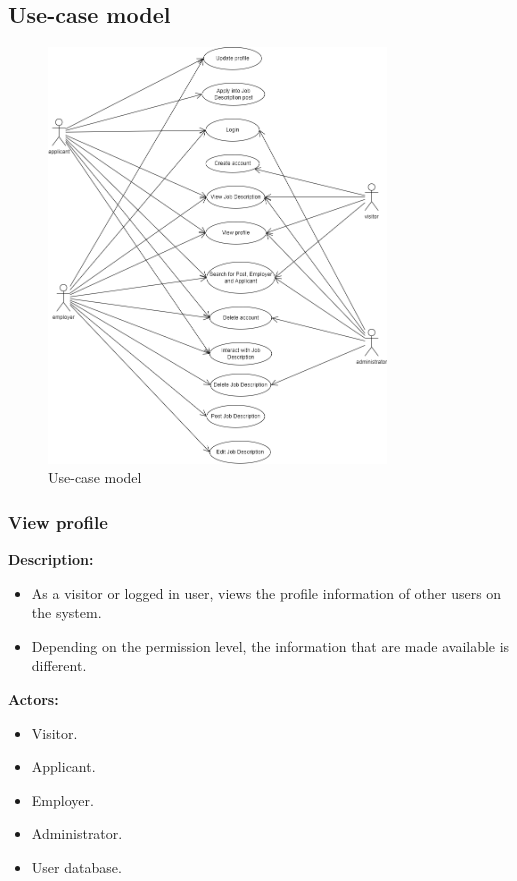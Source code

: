 \documentclass[a4paper]{article}
\begin{document}
\pagebreak
\subsection{Use-case model}

\begin{figure}[H]
  \centering
  \includegraphics[width=0.8\textwidth]{usecase_model.drawio.png}
  \caption{Use-case model}
  \label{fig:fig1}
\end{figure}

\subsubsection{View profile}
\textbf{Description:}
\begin{itemize}
  \item As a visitor or logged in user, views the profile information of other users on the system.
  \item Depending on the permission level, the information that are made available is different.
\end{itemize}

\textbf{Actors:}
\begin{itemize}
  \item Visitor.
  \item Applicant.
  \item Employer.
  \item Administrator.
  \item User database.
\end{itemize}
\end{document}

